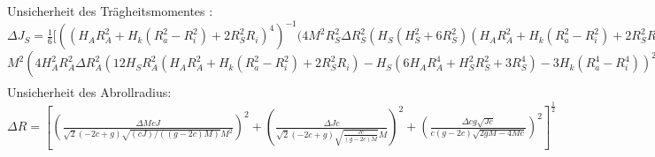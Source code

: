 \subsection*{}
Unsicherheit des Trägheitsmomentes :\\
$\Delta J_S= \frac{1}{6} [ ((H_{A} R_{A}^{2} + H_{k} (R_{a}^{2} - R_{i}^{2}) + 2 R_{S}^{2} R_{i})^{4})^{-1} (4 M^{2} R_{S}^{2} \Delta R_{S}^{2} (H_{S} (H_{S}^{2} + 6 R_{S}^{2}) (H_{A} R_{A}^{2} + H_{k} (R_{a}^{2} - R_{i}^{2}) + 2 R_{S}^{2} R_{i}) - 2 R_{i} (H_{S} (6 H_{A} R_{A}^{4} + H_{S}^{2} R_{S}^{2} + 3 R_{S}^{4}) + 3 H_{k} (R_{a}^{4} - R_{i}^{4})))^{2} +$ \\
$M^{2} (4 H_{A}^{2} R_{A}^{2} \Delta R_{A}^{2} (12 H_{S} R_{A}^{2} (H_{A} R_{A}^{2} + H_{k} (R_{a}^{2} - R_{i}^{2}) + 2 R_{S}^{2} R_{i}) - H_{S} (6 H_{A} R_{A}^{4} + H_{S}^{2} R_{S}^{2} + 3 R_{S}^{4}) - 3 H_{k} (R_{a}^{4} - R_{i}^{4}))^{2} + 4 H_{k}^{2} R_{a}^{2} \Delta R_{a}^{2} (- H_{S} (6 H_{A} R_{A}^{4} + H_{S}^{2} R_{S}^{2} + 3 R_{S}^{4}) - 3 H_{k} (R_{a}^{4} - R_{i}^{4}) + 6.0 R_{a}^{2} (H_{A} R_{A}^{2} + H_{k} (R_{a}^{2} - R_{i}^{2}) + 2 R_{S}^{2} R_{i}))^{2} + R_{A}^{4} \Delta H_{A}^{2} (6 H_{S} R_{A}^{2} (H_{A} R_{A}^{2} + H_{k} (R_{a}^{2} - R_{i}^{2}) + 2 R_{S}^{2} R_{i}) - H_{S}  (6 H_{A} R_{A}^{4} + H_{S}^{2} R_{S}^{2} + 3 R_{S}^{4} ) - 3 H_{k}  (R_{a}^{4} - R_{i}^{4} ) )^{2} + \Delta H_{k}^{2}  ( (R_{a}^{2} - R_{i}^{2} )  (H_{S}  (6 H_{A} R_{A}^{4} + H_{S}^{2} R_{S}^{2} + 3 R_{S}^{4} ) + 3 H_{k}  (R_{a}^{4} - R_{i}^{4} ) ) - 3  (R_{a}^{4} - R_{i}^{4} )  (H_{A} R_{A}^{2} + H_{k}  (R_{a}^{2} - R_{i}^{2} ) + 2 R_{S}^{2} R_{i} ) )^{2} + \Delta R_{i}^{2}  (12.0 H_{k} R_{i}^{3}  (H_{A} R_{A}^{2} + H_{k}  (R_{a}^{2} - R_{i}^{2} ) + 2 R_{S}^{2} R_{i} ) - 2  (H_{S}  (6 H_{A} R_{A}^{4} + H_{S}^{2} R_{S}^{2} + 3 R_{S}^{4} ) + 3 H_{k}  (R_{a}^{4} - R_{i}^{4} ) )  (H_{k} R_{i} - R_{S}^{2} ) )^{2} ) +  (9 M^{2} \Delta H_{S}^{2}  (2 H_{A} R_{A}^{4} + H_{S}^{2} R_{S}^{2} + R_{S}^{4} )^{2} + \Delta M^{2}  (H_{S}  (6 H_{A} R_{A}^{4} + H_{S}^{2} R_{S}^{2} + 3 R_{S}^{4} ) + 3 H_{k}  (R_{a}^{4} - R_{i}^{4} ) )^{2} )  (H_{A} R_{A}^{2} + H_{k}  (R_{a}^{2} - R_{i}^{2} ) + 2 R_{S}^{2} R_{i} )^{2} )  ]^{\frac{1}{2}} $
\begin{align}
\label{eq:uJfall}
\end{align}
Unsicherheit des Abrollradius:\\
$
\Delta R =\left[ 
(\frac{\Delta M c J}{\sqrt{2} (-2 c+g) \sqrt{(c J)/((g-2c) M)} M^2})^2
+(\frac{\Delta J c}{\sqrt{2} (-2 c+g) \sqrt{\frac{J c}{(g-2c) M}} M})^2
+(\frac{\Delta c g \sqrt{J c}}{ c (g-2 c)\sqrt{2 g M-4 M c}})^2 
\right]^{\frac{1}{2}}	
$
\begin{align}
	\label{eq:uR}
\end{align}







